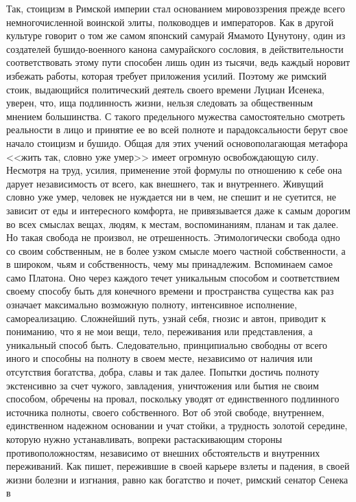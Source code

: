 Так, стоицизм в Римской империи стал основанием мировоззрения прежде всего
немногочисленной воинской элиты, полководцев и императоров. Как в другой
культуре говорит о том же самом японский самурай Ямамото Цунутону, один из
создателей бушидо-военного канона самурайского сословия, в действительности
соответствовать этому пути способен лишь один из тысячи, ведь каждый норовит
избежать работы, которая требует приложения усилий. Поэтому же римский стоик,
выдающийся политический деятель своего времени Луциан Исенека, уверен, что, ища
подлинность жизни, нельзя следовать за общественным мнением большинства. С
такого предельного мужества самостоятельно смотреть реальности в лицо и принятие
ее во всей полноте и парадоксальности берут свое начало стоицизм и бушидо. Общая
для этих учений основополагающая метафора <<жить так, словно уже умер>> имеет
огромную освобождающую силу. Несмотря на труд, усилия, применение этой формулы
по отношению к себе она дарует независимость от всего, как внешнего, так и
внутреннего. Живущий словно уже умер, человек не нуждается ни в чем, не спешит и
не суетится, не зависит от еды и интересного комфорта, не привязывается даже к
самым дорогим во всех смыслах вещах, людям, к местам, воспоминаниям, планам и
так далее. Но такая свобода не произвол, не отрешенность. Этимологически свобода
одно со своим собственным, не в более узком смысле моего частной собственности,
а в широком, чьям и собственность, чему мы принадлежим. Вспоминаем самое само
Платона. Оно через каждого течет уникальным способом и соответствием своему
способу быть для конечного времени и пространства существа как раз означает
максимально возможную полноту, интенсивное исполнение, самореализацию.
Сложнейший путь, узнай себя, гнозис и автон, приводит к пониманию, что я не мои
вещи, тело, переживания или представления, а уникальный способ быть.
Следовательно, принципиально свободны от всего иного и способны на полноту в
своем месте, независимо от наличия или отсутствия богатства, добра, славы и так
далее. Попытки достичь полноту экстенсивно за счет чужого, завладения,
уничтожения или бытия не своим способом, обречены на провал, поскольку уводят от
единственного подлинного источника полноты, своего собственного. Вот об этой
свободе, внутреннем, единственном надежном основании и учат стойки, а трудность
золотой середине, которую нужно устанавливать, вопреки растаскивающим стороны
противоположностям, независимо от внешних обстоятельств и внутренних
переживаний. Как пишет, пережившие в своей карьере взлеты и падения, в своей
жизни болезни и изгнания, равно как богатство и почет, римский сенатор Сенека в
